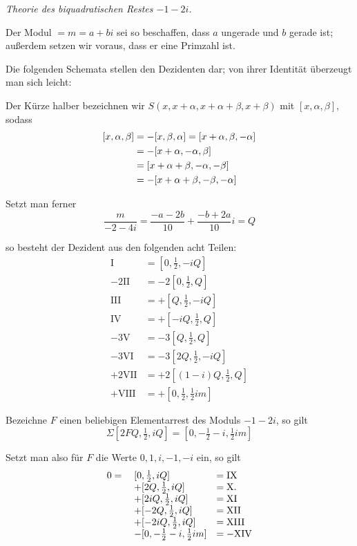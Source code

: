 \begin{center}\emph{Theorie des biquadratischen Restes $-1-2i$.}\end{center}
Der Modul $=m=a+bi$ sei so beschaffen, dass $a$ ungerade und $b$ gerade ist; außerdem setzen wir voraus, dass er eine Primzahl ist.

Die folgenden Schemata stellen den Dezidenten dar; von ihrer Identität überzeugt man sich leicht:
\begin{center}\resizebox{\textwidth}{!}{}\end{center}

Der Kürze halber bezeichnen wir $S(x,x+\alpha,x+\alpha+\beta,x+\beta)$ mit $[x,\alpha,\beta]$, sodass
\[
\begin{aligned}
\relax
[x,\alpha,\beta]&=-[x,\beta,\alpha]=[x+\alpha,\beta,-\alpha]\\
&=-[x+\alpha,-\alpha,\beta]\\
&=[x+\alpha+\beta,-\alpha,-\beta]\\
&=-[x+\alpha+\beta,-\beta,-\alpha]
\end{aligned}
\]

Setzt man ferner
\[
\frac{m}{-2-4i}=\frac{-a-2b}{10}+\frac{-b+2a}{10}i=Q
\]

so besteht der Dezident aus den folgenden acht Teilen:
\[
\begin{aligned}
\mathrm{I}&=[0,\tfrac12,-iQ]\\
-2\mathrm{II}&=-2[0,\tfrac12,Q]\\
\mathrm{III}&=+[Q,\tfrac12,-iQ]\\
\mathrm{IV}&=+[-iQ,\tfrac12,Q]\\
-3\mathrm{V}&=-3[Q,\tfrac12,Q]\\
-3\mathrm{VI}&=-3[2Q,\tfrac12,-iQ]\\
+2\mathrm{VII}&=+2[(1-i)Q,\tfrac12,Q]\\
+\mathrm{VIII}&=+[0,\tfrac12,\tfrac12im]
\end{aligned}
\]

Bezeichne $F$ einen beliebigen Elementarrest des Moduls $-1-2i$, so gilt
\[
\Sigma[2FQ,\tfrac12,iQ]=[0,-\tfrac12-i,\tfrac12im]
\]

Setzt man also für $F$ die Werte $0,1,i,-1,-i$ ein, so gilt
\[
\begin{array}{rll}
0={}&[0,\tfrac12,iQ]&=\mathrm{IX}\\
&+[2Q,\tfrac12,iQ]&=\mathrm{X}\mathbin{.}\\
&+[2iQ,\tfrac12,iQ]&=\mathrm{XI}\\
&+[-2Q,\tfrac12,iQ]&=\mathrm{XII}\\
&+[-2iQ,\tfrac12,iQ]&=\mathrm{XIII}\\
&-[0,-\tfrac12-i,\tfrac12im]&=-\mathrm{XIV}
\end{array}
\]

